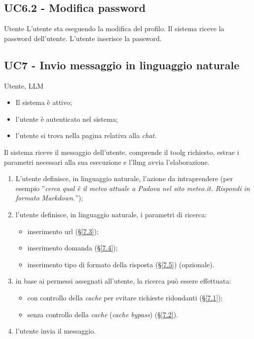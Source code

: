\subsection{UC6.2 - Modifica password}
\label{6.2}
\makeUC{}
{Utente}
{L'utente sta eseguendo la modifica del profilo.}
{Il sistema riceve la password dell'utente.}
{L'utente inserisce la password.}{}{}{}{}

\subsection{UC7 - Invio messaggio in linguaggio naturale}
\label{7}
{Utente, LLM}
{   \begin{itemize}
        \item Il sistema è attivo;
        \item l'utente è autenticato nel sistema;
        \item l'utente si trova nella pagina relativa alla \textit{chat}.
    \end{itemize}
}
{Il sistema riceve il messaggio dell'utente, comprende il \gls{toolg} richiesto, 
estrae i parametri necessari alla sua esecuzione e l'\gls{llmg} avvia l'elaborazione.}
{   \begin{enumerate}
        \item L'utente definisce, in linguaggio naturale, l'azione da intraprendere
        (per esempio ''\textit{cerca qual è il meteo attuale a Padova nel sito meteo.it. Rispondi in formato Markdown.}'');
        \item l'utente definisce, in linguaggio naturale, i parametri di ricerca:
            \begin{itemize}
                \item inserimento url (§\ref{7.3});
                \item inserimento domanda (§\ref{7.4});
                \item inserimento tipo di formato della risposta (§\ref{7.5}) (opzionale).
            \end{itemize}
        \item in base ai permessi assegnati all'utente, la ricerca può essere effettuata:
            \begin{itemize}
                \item con controllo della \textit{cache} per evitare richieste ridondanti (§\ref{7.1});
                \item senza controllo della \textit{cache} (\textit{cache bypass}) (§\ref{7.2}).
            \end{itemize}
        \item l'utente invia il messaggio.
    \end{enumerate}
}
